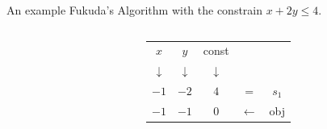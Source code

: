 \begin{frame}{An example}
Fukuda's Algorithm with the constrain $ x+2y \leq 4 $.
\begin{columns}[c]
\begin{column}{5cm}
\end{column}
\begin{column}{5cm}
\begin{tabular}{| c | c || c || c c |}
	\hline	
	$x$ & $y$ & const & & \\
	$\downarrow$ &$\downarrow$ &$\downarrow$ & & \\
	\hline
	\hline	
   	$-1$ & $-2$ & $4$ & = & $s_1$\\ \hline \hline	
   	$-1$ & $-1$ & $0$ & $\leftarrow$ & obj \\
   	\hline	
\end{tabular}


\end{column}
\end{columns}
\end{frame}
